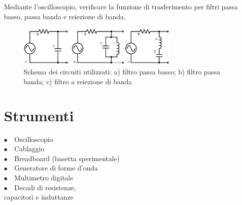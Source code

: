 Mediante l'oscilloscopio, verificare la funzione di trasferimento per filtri passa basso, passa banda e reiezione di banda.\begin{figure}
	\centering
    \includegraphics[width=0.7\textwidth]{circuiti.pdf}
    \caption{Schema dei circuiti utilizzati: a) filtro passa basso; b) filtro passa banda; c) filtro a reiezione di banda}
    \label{fig:circuito}
\end{figure}

\section{Strumenti}

$\bullet \quad$Oscilloscopio \\
$\bullet \quad$Cablaggio\\
$\bullet \quad$Breadboard (basetta sperimentale)\\
$\bullet \quad$Generatore di forme d'onda\\
$\bullet \quad$Multimetro digitale\\
$\bullet \quad$Decadi di resistenze,\\
\hspace{20pt} capacitori e induttanze\\
